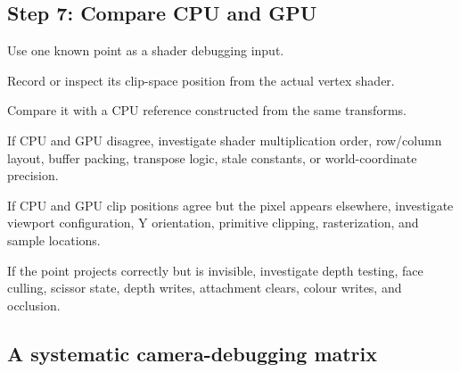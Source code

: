 \subsection{Step 7: Compare CPU and GPU}\label{02-foundations-ii-ch037-step-7-compare-cpu-and-gpu}

Use one known point as a shader debugging input.

Record or inspect its clip-space position from the actual vertex shader.

Compare it with a CPU reference constructed from the same transforms.

If CPU and GPU disagree, investigate shader multiplication order, row/column layout, buffer packing, transpose logic, stale constants, or world-coordinate precision.

If CPU and GPU clip positions agree but the pixel appears elsewhere, investigate viewport configuration, Y orientation, primitive clipping, rasterization, and sample locations.

If the point projects correctly but is invisible, investigate depth testing, face culling, scissor state, depth writes, attachment clears, colour writes, and occlusion.

\subsection{A systematic camera-debugging matrix}\label{02-foundations-ii-ch037-a-systematic-camera-debugging-matrix}


